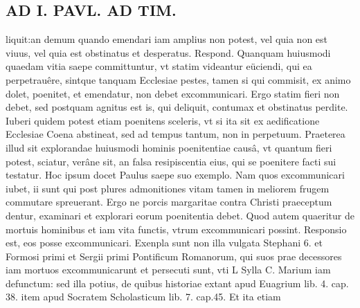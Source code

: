 \documentclass{article}
\begin{document}
\begin{pages}
\section*{AD I. PAVL. AD TIM. }
\marginpar{[ p.330 ]}\pstart liquit:an demum quando emendari iam amplius non potest, vel quia non est viuus, vel quia est obstinatus et desperatus. Respond. Quanquam huiusmodi quaedam vitia saepe committuntur, vt statim videantur eüciendi, qui ea perpetrauêre, sintque tanquam Ecclesiae pestes, tamen si qui commisit, ex animo dolet, poenitet, et emendatur, non debet excommunicari. Ergo statim fieri non debet, sed postquam agnitus est is, qui deliquit, contumax et obstinatus perdite. Iuberi quidem potest etiam poenitens sceleris, vt si ita sit ex aedificatione Ecclesiae Coena abstineat, sed ad tempus tantum, non in perpetuum. Praeterea illud sit explorandae huiusmodi hominis poenitentiae causâ, vt quantum fieri potest, sciatur, verâne sit, an falsa resipiscentia eius, qui se poenitere facti sui testatur. Hoc ipsum docet Paulus saepe suo exemplo. Nam quos excommunicari iubet, ii sunt qui post plures admonitiones vitam tamen in meliorem frugem commutare spreuerant. Ergo ne porcis margaritae contra Christi praeceptum dentur, examinari et explorari eorum poenitentia debet. Quod autem quaeritur de mortuis hominibus et iam vita functis, vtrum excommunicari possint. Responsio est, eos posse excommunicari. Exenpla sunt non illa vulgata Stephani 6. et Formosi primi et Sergii primi Pontificum Romanorum, qui suos prae decessores iam mortuos excommunicarunt et persecuti sunt, vti L Sylla C. Marium iam defunctum: sed illa potius, de quibus historiae extant apud Euagrium lib.  4. cap. 38. item apud Socratem Scholasticum lib. 7. cap.45. Et ita etiam  \pend

\end{pages}
\end{document}

